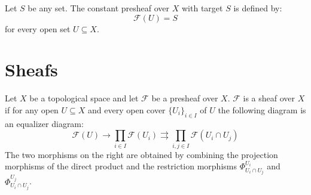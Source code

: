 	\begin{example}\label{sheaf:constant_presheaf}
		Let $S$ be any set. The constant presheaf over $X$ with target $S$ is defined by:\[\mathcal{F}(U) = S\] for every open set $U\subseteq X$.
	\end{example}

\section{Sheafs}
	
	\begin{property}
		Let $X$ be a topological space and let $\mathcal{F}$ be a presheaf over $X$. $\mathcal{F}$ is a sheaf over $X$ if for any open $U\subseteq X$ and every open cover $\{U_i\}_{i\in I}$ of $U$ the following diagram is an equalizer diagram:
		\begin{equation}
			\mathcal{F}(U)\rightarrow\prod_{i\in I}\mathcal{F}(U_i)\rightrightarrows\prod_{i, j\in I}\mathcal{F}(U_i\cap U_j)
		\end{equation}
		The two morphisms on the right are obtained by combining the projection morphisms of the direct product and the restriction morphisms $\Phi^{U_i}_{U_i\cap U_j}$ and $\Phi^{U_j}_{U_i\cap U_j}$.
	\end{property}
	
